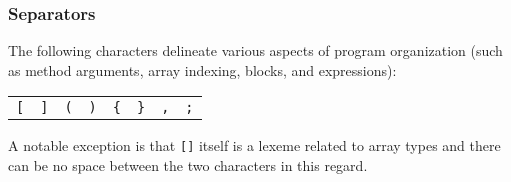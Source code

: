 \subsubsection{Separators}
The following characters delineate various aspects of program organization (such as method arguments, array indexing, blocks, and expressions):
\begin{center}
\begin{tabular}{cccccccc}
\verb![! & \verb|]| & \verb!(! & \verb!)! & \verb!{! & \verb!}! & \verb!,! & \verb!;!\\
\end{tabular}
\end{center}
A notable exception is that \verb![]! itself is a lexeme related to array types and there can be no space between the two characters in this regard.

